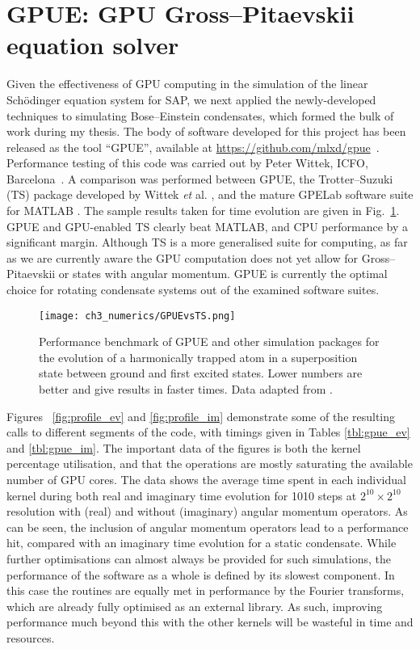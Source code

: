 \section{GPUE: GPU Gross--Pitaevskii equation solver}\label{sec:GPUE}

Given the effectiveness of GPU computing in the simulation of the linear Sch\"odinger equation system for SAP, we next applied the newly-developed techniques to simulating Bose--Einstein condensates, which formed the bulk of work during my thesis. The body of software developed for this project has been released as the tool ``GPUE'', available at \url{https://github.com/mlxd/gpue}~\cite{MLXD_GPUE}. Performance testing of this code was carried out by Peter Wittek, ICFO, Barcelona~\cite{Wittek:2016}. A comparison was performed between GPUE, the Trotter--Suzuki (TS) package developed by Wittek \textit{et} al. \cite{NUM:Wittek_cpc_2013}, and the mature GPELab software suite for MATLAB \cite{NUM:GPElab_1,NUM:GPElab_2}. The sample results taken for time evolution are given in Fig.~\ref{fig:gpuevsts}. GPUE and GPU-enabled TS clearly beat MATLAB, and CPU performance by a significant margin. Although TS is a more generalised suite for computing, as far as we are currently aware the GPU computation does not yet allow for Gross--Pitaevskii or states with angular momentum. GPUE is currently the optimal choice for rotating condensate systems out of the examined software suites.

\begin{figure}[htb]
    \centering
    \texttt{[image: ch3\_numerics/GPUEvsTS.png]}
    \caption{Performance benchmark of GPUE and other simulation packages for the evolution of a harmonically trapped atom in a superposition state between ground and first excited states. Lower numbers are better and give results in faster times. Data adapted from \cite{Wittek:2016}. }
    \label{fig:gpuevsts}
\end{figure}

Figures ~\ref{fig:profile_ev} and \ref{fig:profile_im} demonstrate some of the resulting calls to different segments of the code, with timings given in Tables \ref{tbl:gpue_ev} and \ref{tbl:gpue_im}. The important data of the figures is both the kernel percentage utilisation, and that the operations are mostly saturating the available number of GPU cores. The data shows the average time spent in each individual kernel during both real and imaginary time evolution for 1010 steps at $2^{10}\times 2^{10}$ resolution with (real) and without (imaginary) angular momentum operators. As can be seen, the inclusion of angular momentum operators lead to a performance hit, compared with an imaginary time evolution for a static condensate. While further optimisations can almost always be provided for such simulations, the performance of the software as a whole is defined by its slowest component. In this case the routines are equally met in performance by the Fourier transforms, which are already fully optimised as an external library. As such, improving performance much beyond this with the other kernels will be wasteful in time and resources.

